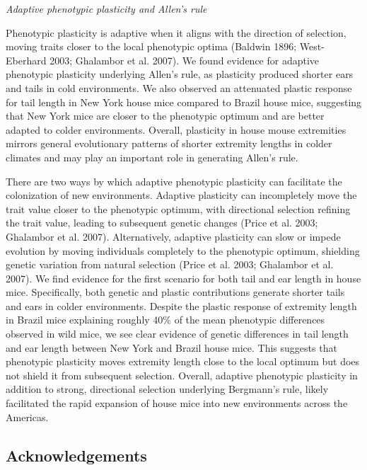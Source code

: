\documentclass[
]{article}
\begin{document}
\vspace{3.5mm}

\noindent\emph{Adaptive phenotypic plasticity and Allen's rule}

Phenotypic plasticity is adaptive when it aligns with the direction of
selection, moving traits closer to the local phenotypic optima (Baldwin
1896; West-Eberhard 2003; Ghalambor et al. 2007). We found evidence for
adaptive phenotypic plasticity underlying Allen's rule, as plasticity
produced shorter ears and tails in cold environments. We also observed
an attenuated plastic response for tail length in New York house mice
compared to Brazil house mice, suggesting that New York mice are closer
to the phenotypic optimum and are better adapted to colder environments.
Overall, plasticity in house mouse extremities mirrors general
evolutionary patterns of shorter extremity lengths in colder climates
and may play an important role in generating Allen's rule.

There are two ways by which adaptive phenotypic plasticity can
facilitate the colonization of new environments. Adaptive plasticity can
incompletely move the trait value closer to the phenotypic optimum, with
directional selection refining the trait value, leading to subsequent
genetic changes (Price et al. 2003; Ghalambor et al. 2007).
Alternatively, adaptive plasticity can slow or impede evolution by
moving individuals completely to the phenotypic optimum, shielding
genetic variation from natural selection (Price et al. 2003; Ghalambor
et al. 2007). We find evidence for the first scenario for both tail and
ear length in house mice. Specifically, both genetic and plastic
contributions generate shorter tails and ears in colder environments.
Despite the plastic response of extremity length in Brazil mice
explaining roughly 40\% of the mean phenotypic differences observed in
wild mice, we see clear evidence of genetic differences in tail length
and ear length between New York and Brazil house mice. This suggests
that phenotypic plasticity moves extremity length close to the local
optimum but does not shield it from subsequent selection. Overall,
adaptive phenotypic plasticity in addition to strong, directional
selection underlying Bergmann's rule, likely facilitated the rapid
expansion of house mice into new environments across the Americas.

\vspace{5mm}

\hypertarget{acknowledgements}{%
\subsection{Acknowledgements}\label{acknowledgements}}
\end{document}
